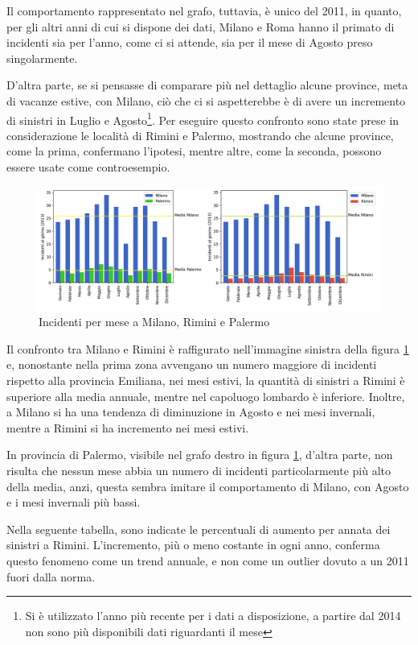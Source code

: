 \documentclass[a4paper,12pt]{report}
\begin{document}
Il comportamento rappresentato nel grafo, tuttavia, è unico del 2011, in quanto, 
per gli altri anni di cui si dispone dei dati, 
Milano e Roma hanno il primato di incidenti sia per l'anno, come ci si attende, sia per il 
mese di Agosto preso singolarmente. 

D'altra parte, se si pensasse di comparare più nel dettaglio alcune province, 
meta di vacanze estive, con Milano, ciò che ci si aspetterebbe è 
di avere un incremento di sinistri in Luglio e 
Agosto\footnote{Si è utilizzato l'anno più recente per i dati a disposizione, 
a partire dal 2014 non sono più disponibili dati riguardanti il mese}. 
Per eseguire questo confronto sono state prese in considerazione le 
località di Rimini e Palermo, mostrando che alcune province, come la prima, 
confermano l'ipotesi, mentre altre, 
come la seconda, possono essere usate come controesempio. 

\begin{figure}
    \includegraphics[width=\linewidth]{img_unite/milano_rimini_palermo.png}
    \caption{Incidenti per mese a Milano, Rimini e Palermo}
    \label{fig:milano-rimini}
\end{figure}

Il confronto tra Milano e Rimini è raffigurato nell'immagine sinistra della 
figura \ref{fig:milano-rimini} e, nonostante nella prima zona 
avvengano un numero maggiore di 
incidenti rispetto alla provincia Emiliana, nei mesi estivi, 
la quantità di sinistri a Rimini è superiore alla media annuale, 
mentre nel capoluogo lombardo è inferiore. 
Inoltre, a Milano si ha una tendenza di diminuzione in Agosto e nei 
mesi invernali, mentre a Rimini si ha incremento nei mesi estivi. 

In provincia di Palermo, visibile nel grafo destro in figura \ref{fig:milano-rimini}, 
d'altra parte, non risulta che nessun mese abbia un numero di incidenti 
particolarmente più alto della media, anzi, questa sembra imitare il comportamento di 
Milano, con Agosto e i mesi invernali più bassi. 

Nella seguente tabella, sono indicate le percentuali di aumento per annata dei sinistri 
a Rimini. 
L'incremento, più o meno costante in ogni anno, conferma questo fenomeno come un trend 
annuale, e non come un outlier dovuto a un 2011 fuori dalla norma. 
\end{document}
